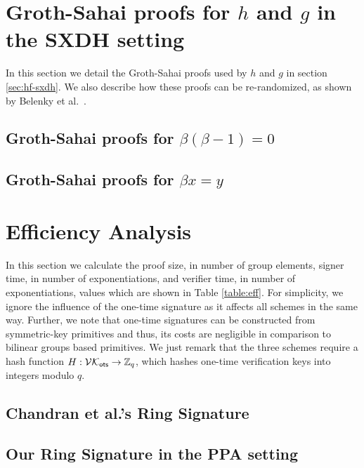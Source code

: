\documentclass{llncs}
\begin{document}
	\section{Groth-Sahai proofs for $h$ and $g$ in the SXDH setting} \label{sec:GSproofs-hg}
	
	In this section we detail the Groth-Sahai proofs used by $h$ and $g$ in section \ref{sec:hf-sxdh}. We also describe how these proofs can be re-randomized, as shown by Belenky et al.~\cite{C:BCCKLS09}.
		\subsection{Groth-Sahai proofs for $\beta(\beta-1)=0$} \label{sec:GSproofs-h}
		
			
			
		\subsection{Groth-Sahai proofs for $\beta x = y$} \label{sec:GSproofs-g}
		
			

%

	\section{Efficiency Analysis} \label{sec:eff-analysis}
		In this section we calculate the proof size, in number of group elements, signer time, in number of exponentiations, and verifier time, in number of exponentiations, values which are shown in Table \ref{table:eff}. For simplicity, we ignore the influence of the one-time signature as it affects all schemes in the same way. Further, we note that one-time signatures can be constructed from symmetric-key primitives and thus, its costs are negligible in comparison to bilinear groups based primitives. We just remark that the three schemes require a hash function $H:\mathcal{VK}_{\mathsf{ots}}\to\mathbb{Z}_q$, which hashes one-time verification keys into integers modulo $q$.
		\subsection{Chandran et al.'s Ring Signature}
			
		\subsection{Our Ring Signature in the PPA setting}
			
\end{document}
